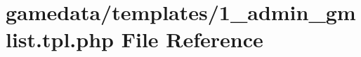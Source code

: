 \hypertarget{1__admin__gmlist_8tpl_8php}{\section{gamedata/templates/1\+\_\+admin\+\_\+gmlist.tpl.\+php File Reference}
\label{1__admin__gmlist_8tpl_8php}
}
